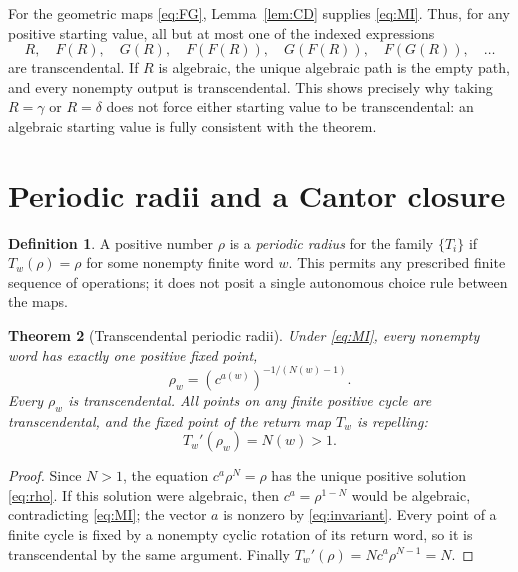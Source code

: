 \documentclass[11pt,a4paper]{article}
\numberwithin{equation}{section}
\newtheorem{theorem}{Theorem}[section]
\theoremstyle{definition}
\newtheorem{definition}[theorem]{Definition}
\theoremstyle{remark}
\begin{document}
For the geometric maps \eqref{eq:FG}, Lemma~\ref{lem:CD} supplies \eqref{eq:MI}. Thus, for any positive starting value, all but at most one of the indexed expressions
\[
 R,\quad F(R),\quad G(R),\quad F(F(R)),\quad
 G(F(R)),\quad F(G(R)),\quad\ldots
\]
are transcendental. If $R$ is algebraic, the unique algebraic path is the empty path, and every nonempty output is transcendental. This shows precisely why taking $R=\gamma$ or $R=\delta$ does not force either starting value to be transcendental: an algebraic starting value is fully consistent with the theorem.

\section{Periodic radii and a Cantor closure}\label{sec:periodic}

\begin{definition}
A positive number $\rho$ is a \emph{periodic radius} for the family $\{T_i\}$ if $T_w(\rho)=\rho$ for some nonempty finite word $w$. This permits any prescribed finite sequence of operations; it does not posit a single autonomous choice rule between the maps.
\end{definition}

\begin{theorem}[Transcendental periodic radii]\label{thm:periodic}
Under \eqref{eq:MI}, every nonempty word has exactly one positive fixed point,
\begin{equation}\label{eq:rho}
 \rho_w=(c^{a(w)})^{-1/(N(w)-1)}.
\end{equation}
Every $\rho_w$ is transcendental. All points on any finite positive cycle are transcendental, and the fixed point of the return map $T_w$ is repelling:
\[
 T_w'(\rho_w)=N(w)>1.
\]
\end{theorem}
\begin{proof}
Since $N>1$, the equation $c^a\rho^N=\rho$ has the unique positive solution \eqref{eq:rho}. If this solution were algebraic, then $c^a=\rho^{1-N}$ would be algebraic, contradicting \eqref{eq:MI}; the vector $a$ is nonzero by \eqref{eq:invariant}. Every point of a finite cycle is fixed by a nonempty cyclic rotation of its return word, so it is transcendental by the same argument. Finally $T_w'(\rho)=Nc^a\rho^{N-1}=N$.
\end{proof}
\end{document}

